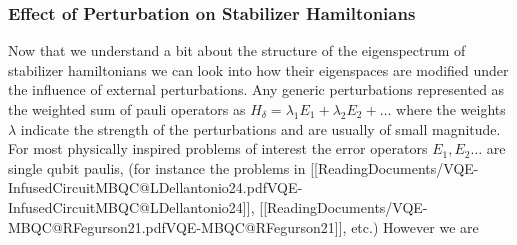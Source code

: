 \documentclass[
]{article}
\begin{document}
\hypertarget{effect-of-perturbation-on-stabilizer-hamiltonians}{%
\subsubsection{Effect of Perturbation on Stabilizer
Hamiltonians}\label{effect-of-perturbation-on-stabilizer-hamiltonians}}

Now that we understand a bit about the structure of the eigenspectrum of
stabilizer hamiltonians we can look into how their eigenspaces are
modified under the influence of external perturbations. Any generic
perturbations represented as the weighted sum of pauli operators as
\(H_{\delta} = \lambda_{1}E_{1} + \lambda_{2}E_{2} + \dots\) where the
weights \(\lambda\) indicate the strength of the perturbations and are
usually of small magnitude. For most physically inspired problems of
interest the error operators \(E_{1}, E_{2} \dots\) are single qubit
paulis, (for instance the problems in
{[}{[}ReadingDocuments/VQE-InfusedCircuitMBQC@LDellantonio24.pdf\textbar VQE-InfusedCircuitMBQC@LDellantonio24{]}{]},
{[}{[}ReadingDocuments/VQE-MBQC@RFegurson21.pdf\textbar VQE-MBQC@RFegurson21{]}{]},
etc.) However we are
\end{document}
